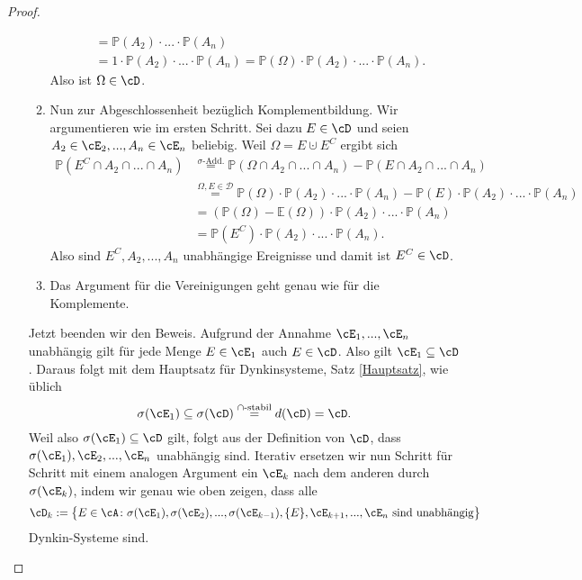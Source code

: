 \begin{proof}
\begin{itemize}
\begin{enumerate}[label=(\roman*)]
\begin{align*}
				 &= \mathbb{P}(A_2) \cdot ... \cdot \mathbb{P}(A_n)\\
				 & = 1 \cdot \mathbb{P}(A_2) \cdot ... \cdot \mathbb{P}(A_n)
				  = \mathbb{P}(\Omega) \cdot \mathbb{P}(A_2) \cdot ... \cdot \mathbb{P}(A_n).
			\end{align*}
			Also ist $\Omega \in \cD$.
			\item Nun zur Abgeschlossenheit bez\"uglich Komplementbildung. Wir argumentieren wie im ersten Schritt. Sei dazu $E \in \cD$ und seien $A_2 \in \cE_2,...,A_n \in \cE_n$ beliebig. Weil $\Omega=E\cupdot E^C$ ergibt sich
			\begin{align*}
				\mathbb{P}(E^C \cap A_2 \cap ... \cap A_n)& \overset{\sigma\text{-Add.}}{=} \mathbb{P}(\Omega \cap A_2 \cap ... \cap A_n) - \mathbb{P}(E \cap A_2 \cap ... \cap A_n) \\
				&\overset{\Omega, E\in \mathcal D}{=} \mathbb{P}(\Omega) \cdot \mathbb{P}(A_2) \cdot ... \cdot \mathbb{P}(A_n) - \mathbb{P}(E) \cdot \mathbb{P}(A_2) \cdot ... \cdot \mathbb{P}(A_n)\\
				&= (\mathbb{P}(\Omega) - \mathbb{E}(\Omega)) \cdot \mathbb{P}(A_2) \cdot ... \cdot \mathbb{P}(A_n)\\
				&= \mathbb{P}(E^C) \cdot \mathbb{P}(A_2) \cdot ... \cdot \mathbb{P}(A_n).
			\end{align*}
			Also sind $E^C, A_2, ...,A_n$ unabh\"angige Ereignisse und damit ist $E^C\in \cD$.
			\item Das Argument f\"ur die Vereinigungen geht genau wie f\"ur die Komplemente.
		\end{enumerate}
		Jetzt beenden wir den Beweis. Aufgrund der Annahme $\cE_1,...,\cE_n$ unabhängig gilt f\"ur jede Menge $E\in \cE_1$ auch $E\in \cD$. Also gilt $\cE_1\subseteq \cD$. Daraus folgt mit dem Hauptsatz f\"ur Dynkinsysteme, Satz \ref{Hauptsatz}, wie \"ublich
			\[ \sigma(\cE_1) \subseteq \sigma(\cD) \overset{\cap\text{-stabil}}{=} d(\cD) = \cD. \]			
			Weil also $\sigma(\cE_1)\subseteq \cD$ gilt, folgt aus der Definition von $\cD$, dass $\sigma(\cE_1), \cE_2,...,\cE_n$ unabhängig sind. Iterativ ersetzen wir nun Schritt f\"ur Schritt mit einem analogen Argument ein $\cE_k$ nach dem anderen durch $\sigma(\cE_k)$, indem wir genau wie oben zeigen, dass alle 
			\begin{align*}
				\cD_k:= \big\{ E \in \cA \colon \sigma(\cE_1), \sigma(\cE_2),... ,\sigma(\cE_{k-1}),\{E\}, \cE_{k+1}, ..., \cE_n \text{ sind unabhängig} \big\}
			\end{align*}
			Dynkin-Systeme sind.
		\end{itemize}
\end{proof}
